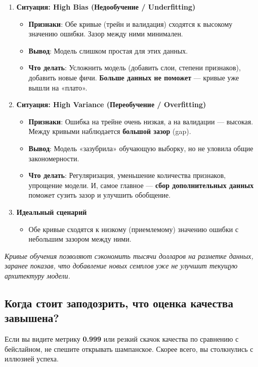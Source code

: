 \documentclass[12pt]{article}
\newcommand{\commentary}[1]{{\small\itshape\color{commentgray} #1}}
\begin{document}
\begin{enumerate}
    \item \textbf{Ситуация: High Bias (Недообучение / Underfitting)}
    \begin{itemize}
        \item \textbf{Признаки}: Обе кривые (трейн и валидация) сходятся к высокому значению ошибки. Зазор между ними минимален.
        \item \textbf{Вывод}: Модель слишком простая для этих данных.
        \item \textbf{Что делать}: Усложнить модель (добавить слои, степени признаков), добавить новые фичи. \textbf{Больше данных не поможет} — кривые уже вышли на «плато».
    \end{itemize}

    \item \textbf{Ситуация: High Variance (Переобучение / Overfitting)}
    \begin{itemize}
        \item \textbf{Признаки}: Ошибка на трейне очень низкая, а на валидации — высокая. Между кривыми наблюдается \textbf{большой зазор} (gap).
        \item \textbf{Вывод}: Модель «зазубрила» обучающую выборку, но не уловила общие закономерности.
        \item \textbf{Что делать}: Регуляризация, уменьшение количества признаков, упрощение модели. И, самое главное — \textbf{сбор дополнительных данных} поможет сузить зазор и улучшить обобщение.
    \end{itemize}

    \item \textbf{Идеальный сценарий}
    \begin{itemize}
        \item Обе кривые сходятся к низкому (приемлемому) значению ошибки с небольшим зазором между ними.
    \end{itemize}
\end{enumerate}

\commentary{Кривые обучения позволяют сэкономить тысячи долларов на разметке данных, заранее показав, что добавление новых семплов уже не улучшит текущую архитектуру модели.}

\subsection{Когда стоит заподозрить, что оценка качества завышена?}
Если вы видите метрику \textbf{0.999} или резкий скачок качества по сравнению с бейслайном, не спешите открывать шампанское. Скорее всего, вы столкнулись с иллюзией успеха.
\end{document}
